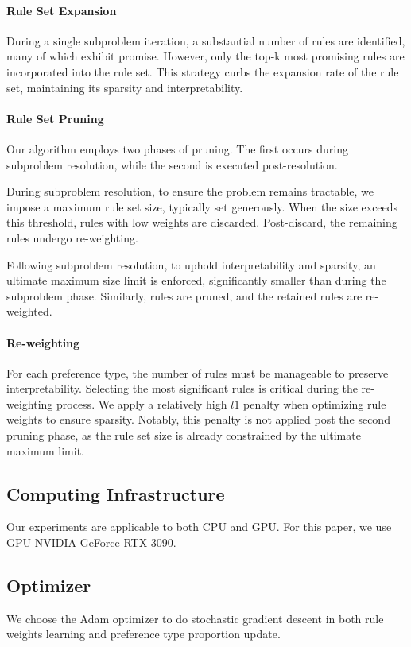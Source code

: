 \documentclass{article} %
\begin{document}
\paragraph{Rule Set Expansion}
During a single subproblem iteration, a substantial number of rules are identified, many of which exhibit promise. However, only the top-k most promising rules are incorporated into the rule set. This strategy curbs the expansion rate of the rule set, maintaining its sparsity and interpretability.

\paragraph{Rule Set Pruning}
Our algorithm employs two phases of pruning. The first occurs during subproblem resolution, while the second is executed post-resolution.

During subproblem resolution, to ensure the problem remains tractable, we impose a maximum rule set size, typically set generously. When the size exceeds this threshold, rules with low weights are discarded. Post-discard, the remaining rules undergo re-weighting.

Following subproblem resolution, to uphold interpretability and sparsity, an ultimate maximum size limit is enforced, significantly smaller than during the subproblem phase. Similarly, rules are pruned, and the retained rules are re-weighted.

\paragraph{Re-weighting}
For each preference type, the number of rules must be manageable to preserve interpretability. Selecting the most significant rules is critical during the re-weighting process. We apply a relatively high $l1$ penalty when optimizing rule weights to ensure sparsity. Notably, this penalty is not applied post the second pruning phase, as the rule set size is already constrained by the ultimate maximum limit.


\subsection{Computing Infrastructure}
Our experiments are applicable to both CPU and GPU. For this paper, we use GPU NVIDIA GeForce RTX 3090.

\subsection{Optimizer}
We choose the Adam optimizer to do stochastic gradient descent in both rule weights learning and preference type proportion update.
\end{document}
